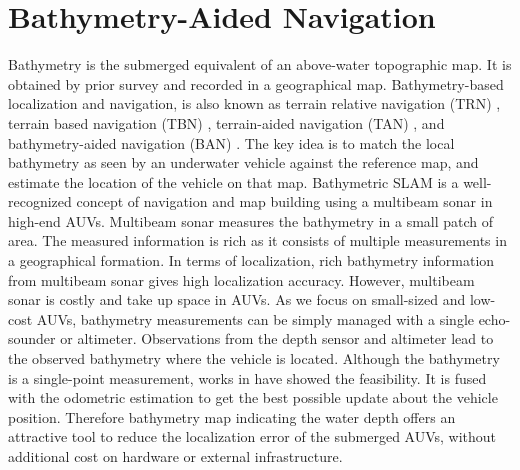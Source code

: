 \section{Bathymetry-Aided Navigation}

Bathymetry is the submerged equivalent of an above-water topographic map. It is obtained by prior survey and recorded in a geographical map. Bathymetry-based localization and navigation, is also known as terrain relative navigation (TRN) \cite{Meduna2010}, terrain based navigation (TBN) \cite{5779659,carreno2010}, terrain-aided navigation (TAN) \cite{carreno2010}, and bathymetry-aided navigation (BAN) \cite{Kalyan2013}. The key idea is to match the local bathymetry as seen by an underwater vehicle against the reference map,  and estimate the location of the vehicle on that map. Bathymetric SLAM is a well-recognized concept of navigation and map building \cite{Barkby2011,NilsBore2018} using a multibeam sonar in high-end AUVs. Multibeam sonar measures the bathymetry in a small patch of area. The measured information is rich as it consists of multiple measurements in a geographical formation. In terms of localization, rich bathymetry information from multibeam sonar gives high localization accuracy. However, multibeam sonar is costly and take up space in AUVs. As we focus on small-sized and low-cost AUVs, bathymetry measurements can be simply managed with a single echo-sounder \cite{Salavasidis2016} or altimeter. Observations from the depth sensor and altimeter lead to the observed bathymetry where the vehicle is located. Although the bathymetry is a single-point measurement, works in \cite{William2015Journal,Kalyan2013} have showed the feasibility. It is fused with the odometric estimation to get the best possible update about the vehicle position. Therefore bathymetry map indicating the water depth offers an attractive tool to reduce the localization error of the submerged AUVs, without additional cost on hardware or external infrastructure. 

